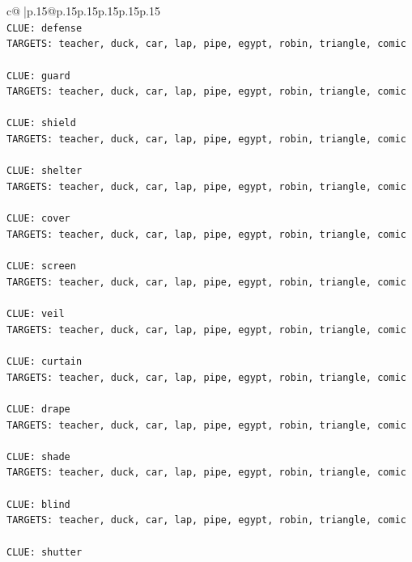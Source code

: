 \documentclass{article}
\begin{document}
{\begin{supertabular}{c@{$\;$}|p{.15\linewidth}@{}p{.15\linewidth}p{.15\linewidth}p{.15\linewidth}p{.15\linewidth}p{.15\linewidth}}
{{{\\ 
\texttt{CLUE: defense} \\
\texttt{TARGETS: teacher, duck, car, lap, pipe, egypt, robin, triangle, comic} \\
\\ 
\texttt{CLUE: guard} \\
\texttt{TARGETS: teacher, duck, car, lap, pipe, egypt, robin, triangle, comic} \\
\\ 
\texttt{CLUE: shield} \\
\texttt{TARGETS: teacher, duck, car, lap, pipe, egypt, robin, triangle, comic} \\
\\ 
\texttt{CLUE: shelter} \\
\texttt{TARGETS: teacher, duck, car, lap, pipe, egypt, robin, triangle, comic} \\
\\ 
\texttt{CLUE: cover} \\
\texttt{TARGETS: teacher, duck, car, lap, pipe, egypt, robin, triangle, comic} \\
\\ 
\texttt{CLUE: screen} \\
\texttt{TARGETS: teacher, duck, car, lap, pipe, egypt, robin, triangle, comic} \\
\\ 
\texttt{CLUE: veil} \\
\texttt{TARGETS: teacher, duck, car, lap, pipe, egypt, robin, triangle, comic} \\
\\ 
\texttt{CLUE: curtain} \\
\texttt{TARGETS: teacher, duck, car, lap, pipe, egypt, robin, triangle, comic} \\
\\ 
\texttt{CLUE: drape} \\
\texttt{TARGETS: teacher, duck, car, lap, pipe, egypt, robin, triangle, comic} \\
\\ 
\texttt{CLUE: shade} \\
\texttt{TARGETS: teacher, duck, car, lap, pipe, egypt, robin, triangle, comic} \\
\\ 
\texttt{CLUE: blind} \\
\texttt{TARGETS: teacher, duck, car, lap, pipe, egypt, robin, triangle, comic} \\
\\ 
\texttt{CLUE: shutter} \\
}}}
\end{supertabular}}
\end{document}
